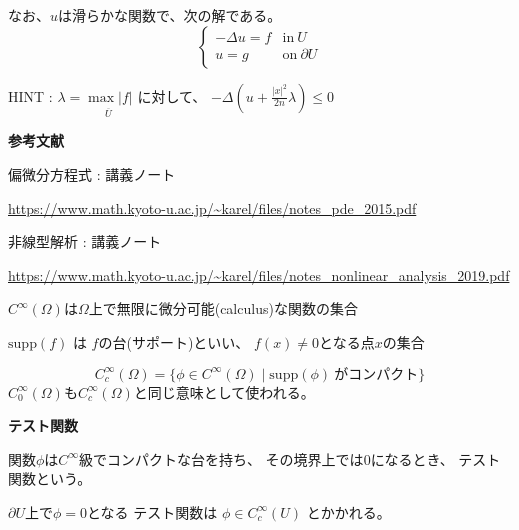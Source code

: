 \documentclass[12pt,b5paper]{ltjsarticle}
\begin{document}
\begin{enumerate}
      なお、$u$は滑らかな関数で、次の解である。
      \begin{equation}
       \begin{cases}
        -\Delta u =f & \text{in}\: U\\
        u=g & \text{on}\: \partial U
       \end{cases}
      \end{equation}


      HINT :
      $\lambda = \underset{\overline{U}}{\max {\lvert f \rvert}}$
      に対して、
      $-\Delta \left(u + \frac{\lvert x \rvert^{2}}{2n}\lambda \right)
      \leq 0$

      \dotfill



      \hrulefill


\end{enumerate}

\hrulefill




\newpage

\hrulefill

\textbf{参考文献}

偏微分方程式 : 講義ノート

\url{https://www.math.kyoto-u.ac.jp/~karel/files/notes_pde_2015.pdf}

非線型解析 : 講義ノート

\url{https://www.math.kyoto-u.ac.jp/~karel/files/notes_nonlinear_analysis_2019.pdf}


\hrulefill

$C^{\infty}(\Omega)$は$\Omega$上で無限に微分可能(calculus)な関数の集合

\dotfill

$\mathrm{supp}(f)$ は $f$の台(サポート)といい、
$f(x)\ne 0$となる点$x$の集合

\dotfill

\begin{equation}
 C_{c}^{\infty}(\Omega)
  =\{ \phi\in C^{\infty}(\Omega) \mid \mathrm{supp}(\phi) \: がコンパクト \}
\end{equation}
$C_{0}^{\infty}(\Omega)$も$C_{c}^{\infty}(\Omega)$と同じ意味として使われる。

\dotfill

\textbf{テスト関数}

関数$\phi$は$C^{\infty}$級でコンパクトな台を持ち、
その境界上では$0$になるとき、
テスト関数という。

$\partial U$上で$\phi=0$となる
テスト関数は
$\phi\in C^{\infty}_{c}(U)$
とかかれる。
\end{document}
